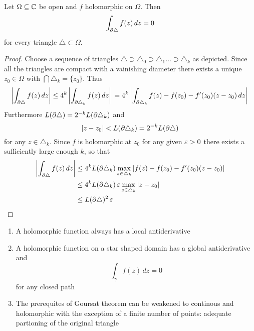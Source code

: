 \begin{definition}
\begin{theorem}[Goursat]\label{thm:thm_goursat}
Let \( \Omega \subseteq \mathbb{C} \) be open and \( f \) holomorphic on \( \Omega \). 
Then
	\[
		\int_{\partial\triangle} f(z)\,dz = 0
	\]
for every triangle \( \triangle \subset \Omega \).
\end{theorem}

\begin{proof}
Choose a sequence of triangles \( \triangle \supset \triangle_0 \supset \triangle_1 \dots \supset \triangle_k \) 
as depicted. Since all the triangles are compact with a vainishing diameter there exists a unique \( z_0 \in \Omega \) with \( \bigcap \triangle_k = \{ z_0 \}  \). Thus
\[
	\left| \int_{\partial\triangle} f(z)\,dz \right| 
		\le 4^k \left| \int_{\partial\triangle_k} f(z)\,dz \right| \\
		= 4^k \left| \int_{\partial\triangle_k} f(z) - f(z_0) - f'(z_0)(z - z_0)\,dz \right| \\
\]
Furthermore \( L(\partial\triangle) = 2^{-k} L(\partial\triangle_k) \) and 
\[
	|z - z_0| < L(\partial\triangle_k) = 2^{-k} L(\partial\triangle)
\]
for any \( z \in \triangle_k \). Since \( f \) is holomorphic at \( z_0 \) for any given \( \varepsilon > 0 \) 
there exists a sufficiently large enough \( k \), so that
\[
	\begin{split}
		\left| \int_{\partial\triangle} f(z)\,dz \right| 
			& \le 4^k L(\partial\triangle_k) \max_{z \in \triangle_k} |f(z) - f(z_0) - f'(z_0)(z - z_0)| \\
			& \le 4^k L(\partial\triangle_k) \,\varepsilon \max_{z \in \triangle_k} |z - z_0| \\
			& \le L(\partial\triangle)^2 \,\varepsilon
	\end{split}
\]
\end{proof}
\bigskip


\begin{corollary}\hfill
    \begin{enumerate}
        \item A holomorphic function always has a local antiderivative 
        \item A holomorphic function on a star shaped domain has a global antiderivative and 
			\[
				\int_{\gamma} f(z)\,dz = 0
			\]
			for any closed path
        \item The prerequites of Goursat theorem can be weakened to continous and holomorphic with 
			the exception of a finite number of points: adequate partioning of the original triangle
    \end{enumerate}
\end{corollary}
\bigskip



\end{definition}
